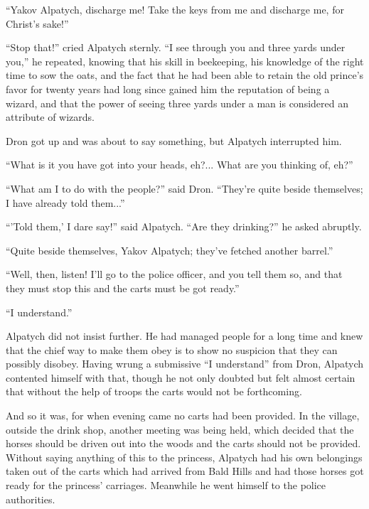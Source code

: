 ``Yakov Alpatych, discharge me! Take the keys from me and
discharge me, for Christ's sake!''

``Stop that!'' cried Alpatych sternly. ``I see through you and
three yards under you,'' he repeated, knowing that his skill in
beekeeping, his knowledge of the right time to sow the oats, and
the fact that he had been able to retain the old prince's favor
for twenty years had long since gained him the reputation of
being a wizard, and that the power of seeing three yards under a
man is considered an attribute of wizards.

Dron got up and was about to say something, but Alpatych
interrupted him.

``What is it you have got into your heads, eh?... What are you
thinking of, eh?''

``What am I to do with the people?'' said Dron. ``They're quite
beside themselves; I have already told them...''

``'Told them,' I dare say!'' said Alpatych. ``Are they
drinking?'' he asked abruptly.

``Quite beside themselves, Yakov Alpatych; they've fetched
another barrel.''

``Well, then, listen! I'll go to the police officer, and you tell
them so, and that they must stop this and the carts must be got
ready.''

``I understand.''

Alpatych did not insist further. He had managed people for a long
time and knew that the chief way to make them obey is to show no
suspicion that they can possibly disobey. Having wrung a
submissive ``I understand'' from Dron, Alpatych contented himself
with that, though he not only doubted but felt almost certain
that without the help of troops the carts would not be
forthcoming.

And so it was, for when evening came no carts had been
provided. In the village, outside the drink shop, another meeting
was being held, which decided that the horses should be driven
out into the woods and the carts should not be provided. Without
saying anything of this to the princess, Alpatych had his own
belongings taken out of the carts which had arrived from Bald
Hills and had those horses got ready for the princess'
carriages. Meanwhile he went himself to the police authorities.


